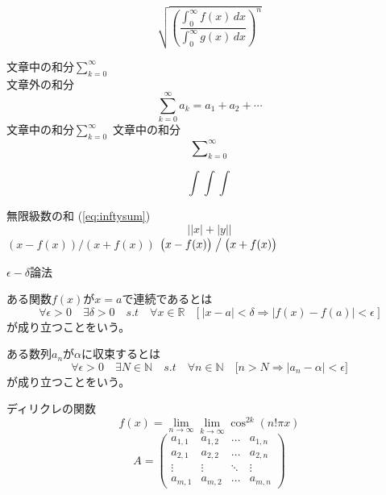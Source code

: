 \documentclass[dvipdfmx]{jsarticle}
\begin{document}
\begin{center}
\end{center}
\clearpage
{}

\begin{tcolorbox}[colback=white,title=粋な枠]
  \[ \sqrt{\left( \frac{\displaystyle\int_0^\infty f(x)\,dx}{\displaystyle\int_0^\infty g(x)\,dx} \right)^n} \]
\end{tcolorbox}

文章中の和分$\sum_{k=0}^\infty$\\
文章外の和分
\begin{equation}
\textstyle\sum\limits_{k=0}^\infty a_k = a_1 + a_2 + \cdots \label{eq:inftysum}
\end{equation}
文章中の和分$\displaystyle\sum_{k=0}^\infty$
文章中の和分\[\sum\nolimits_{k=0}^\infty\]

\[\int\!\!\!\!\int\int\]

無限級数の和 (\ref{eq:inftysum}) \pageref{eq:inftysum}
\[\bigl| |x| + |y| \bigr|\]
$\left(x-f(x)\right) / \left(x+f(x)\right)$
$\bigl(x-f(x)\bigr) \bigm/ \bigl(x+f(x)\bigr)$

$\epsilon - \delta$論法

 ある関数$f(x)$が$x=a$で連続であるとは
\[\forall \epsilon >\!0 \quad \exists \delta >\!0 \quad s.t \quad \forall x \in \mathbb{R} \quad \bigl[\ |x - a|< \delta \Longrightarrow |f(x) - f(a)|< \epsilon\ \bigr]\]
が成り立つことをいう。

ある数列$a_n$が$\alpha$に収束するとは
\[\forall \epsilon > 0 \quad \exists N \in \mathbb{N} \quad s.t \quad \forall n \in \mathbb{N} \quad \bigl[n > N \Longrightarrow |a_n - \alpha| < \epsilon \bigr]\]
が成り立つことをいう。

ディリクレの関数
\begin{equation*}
f(x) = \lim_{n \to \infty} \lim_{k \to \infty} \cos^{2k}(n! \pi x)
\end{equation*}
\[
A = \left(
\begin{matrix}
a_{1,1} & a_{1,2} & \dots  & a_{1,n} \\
a_{2,1} & a_{2,2} & \dots  & a_{2,n} \\
\vdots  & \vdots  & \ddots & \vdots  \\
a_{m,1} & a_{m,2} & \dots  & a_{m,n}
\end{matrix}
\right)
\]
\end{document}
